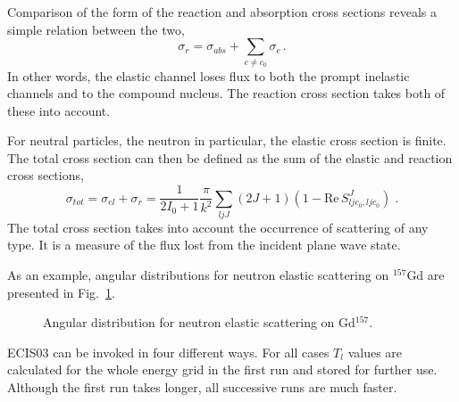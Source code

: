 Comparison of the form of the reaction and absorption cross sections reveals
a simple relation between the two,
\begin{equation}
\sigma_{r}=\sigma_{abs}+\sum_{c\neq c_{0}}\sigma_{c}\,.
\end{equation}
In other words, the elastic channel loses flux to both the prompt inelastic
channels and to the compound nucleus. The reaction cross section takes both
of these into account.

For neutral particles, the neutron in particular, the elastic cross section
is finite. The total cross section can then be defined as the sum of the
elastic and reaction cross sections,
\begin{equation}
\sigma _{tot}=\sigma _{el}+\sigma _{r}=\frac{1}{2I_{0}+1}\frac{\pi }{k^{2}}%
\sum_{ljJ}(2J+1)(1-\text{Re}\,S_{ljc_{0},ljc_{0}}^{J})\;.
\end{equation}%
The total cross section takes into account the occurrence of scattering of
any type. It is a measure of the flux lost from the incident plane wave
state.

As an example, angular distributions for neutron elastic scattering on $%
^{157}$Gd are presented in Fig.~\ref{njoygd157}.
\begin{figure}[htbp]
\caption{Angular distribution for neutron elastic scattering on Gd$^{157}$.}
\label{njoygd157}
\end{figure}

ECIS03%
 can be invoked in four different ways. For all cases $T_{l}$
values are calculated for the whole energy grid in the first run and stored
for further use. Although the first run takes longer, all successive runs
are much faster.

